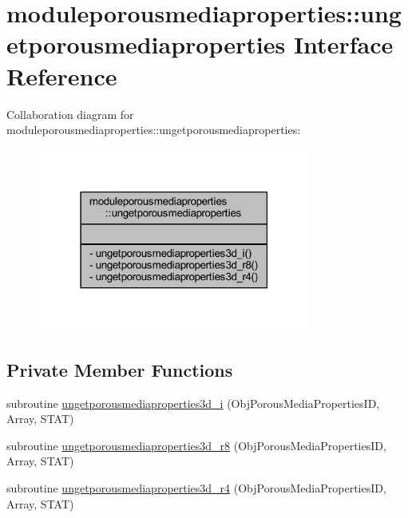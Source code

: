 \hypertarget{interfacemoduleporousmediaproperties_1_1ungetporousmediaproperties}{}\section{moduleporousmediaproperties\+:\+:ungetporousmediaproperties Interface Reference}
\label{interfacemoduleporousmediaproperties_1_1ungetporousmediaproperties}


Collaboration diagram for moduleporousmediaproperties\+:\+:ungetporousmediaproperties\+:\nopagebreak
\begin{figure}[H]
\begin{center}
\leavevmode
\includegraphics[width=255pt]{interfacemoduleporousmediaproperties_1_1ungetporousmediaproperties__coll__graph}
\end{center}
\end{figure}
\subsection*{Private Member Functions}
\begin{DoxyCompactItemize}
\item 
subroutine \mbox{\hyperlink{interfacemoduleporousmediaproperties_1_1ungetporousmediaproperties_a82f51860511077ffbedeea5885fb5d05}{ungetporousmediaproperties3d\+\_\+i}} (Obj\+Porous\+Media\+Properties\+ID, Array, S\+T\+AT)
\item 
subroutine \mbox{\hyperlink{interfacemoduleporousmediaproperties_1_1ungetporousmediaproperties_a422eb3439560900e49cdfb513c6543a3}{ungetporousmediaproperties3d\+\_\+r8}} (Obj\+Porous\+Media\+Properties\+ID, Array, S\+T\+AT)
\item 
subroutine \mbox{\hyperlink{interfacemoduleporousmediaproperties_1_1ungetporousmediaproperties_a2d5d96cbe3893477ff6d108836960562}{ungetporousmediaproperties3d\+\_\+r4}} (Obj\+Porous\+Media\+Properties\+ID, Array, S\+T\+AT)
\end{DoxyCompactItemize}


